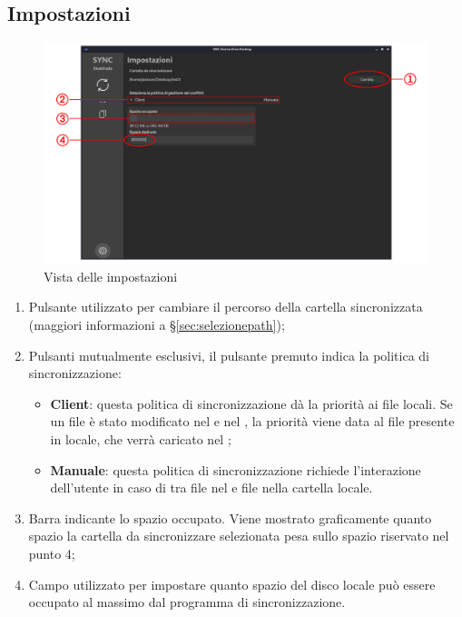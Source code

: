 \subsection{Impostazioni} \label{sec:impostazioni}
\begin{figure}[H]
    \centering
    \includegraphics[scale = 0.30]{components/img/settings.png}
    \caption{Vista delle impostazioni}
    \label{fig:Vista delle impostazioni}
\end{figure}
\begin{enumerate}
	\item Pulsante utilizzato per cambiare il percorso della cartella sincronizzata (maggiori informazioni a \S{}\ref{sec:selezionepath});
	\item Pulsanti mutualmente esclusivi, il pulsante premuto indica la politica di sincronizzazione:
	\begin{itemize}
		\item \textbf{Client}: questa politica di sincronizzazione dà la priorità ai file locali. Se un file è stato modificato nel  e nel , la priorità viene data al file presente in locale, che verrà caricato nel ;
		\item \textbf{Manuale}: questa politica di sincronizzazione richiede l'interazione dell'utente in caso di  tra file nel  e file nella cartella locale.
	\end{itemize}
	\item Barra indicante lo spazio occupato. Viene mostrato graficamente quanto spazio la cartella da sincronizzare selezionata pesa sullo spazio riservato nel punto 4;
	\item Campo utilizzato per impostare quanto spazio del disco locale può essere occupato al massimo dal programma di sincronizzazione.
\end{enumerate}